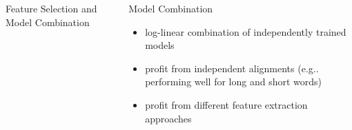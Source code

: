 \documentclass[final,t]{beamer}
\makeatletter
\DeclareRobustCommand\onedot{\futurelet\@let@token\@onedot}
\def\@onedot{\ifx\@let@token.\else.\null\fi\xspace}
\def\eg{{e.g}\onedot} \def\Eg{{E.g}\onedot}
\makeatother
\begin{document}
\begin{frame}{}
\begin{columns}
\begin{column}{.45\linewidth}
\begin{block}{Feature Selection and Model Combination}
      \end{block}
    \end{column}

    \begin{column}{.45\linewidth}
      \begin{block}{Model Combination}
            \begin{itemize}
            \item \alert{log-linear combination} of independently
              trained models
            \item profit from independent alignments (\eg performing
              well for long and short words)
            \item profit from different feature extraction approaches
            \end{itemize}
      \end{block}
    \end{column}
  \end{columns}   %

\end{frame}
\end{document}
